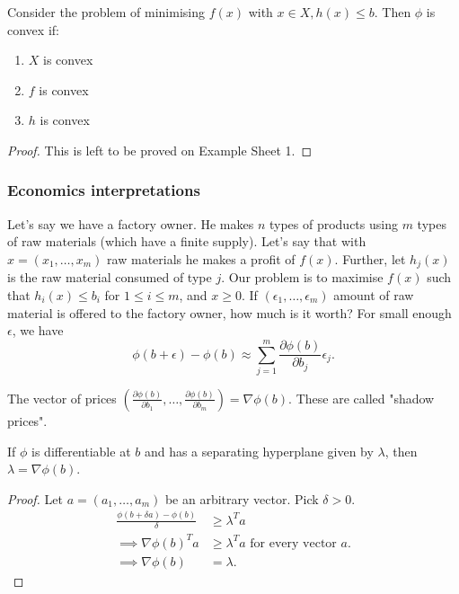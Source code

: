 \documentclass[a4paper]{scrartcl}
\begin{document}
\begin{theorem}
	 Consider the problem of minimising $f (x)$ with $x \in X, h (x)\leq b$. Then $\phi$ is convex if: 
	 \begin{enumerate}
		 \item $X$ is convex
		 \item $f$ is convex
		 \item $h$ is convex
	 \end{enumerate}
\end{theorem}
\begin{proof}
	 This is left to be proved on Example Sheet 1.
\end{proof}
\subsubsection{Economics interpretations}
Let's say we have a factory owner. He makes $n$ types of products using $m$ types of raw materials (which have a finite supply). Let's say that with $x=(x_1,\ldots ,x_m)$ raw materials he makes a profit of $f (x)$.\newline 
Further, let $h_j (x)$ is the raw material consumed of type $j$. Our problem is to maximise $f (x)$ such that $h_i (x) \leq b_i$ for $1 \leq i \leq m$, and $x \geq 0.$\newline 
If $(\epsilon_1,\ldots , \epsilon_m)$ amount of raw material is offered to the factory owner, how much is it worth? For small enough $\epsilon $, we have 
\[\phi (b+\epsilon )-\phi (b)\approx \sum_{j=1}^{m}\frac{\partial \phi (b)}{\partial b_j} \epsilon_j.\]

The vector of prices $(\frac{\partial \phi (b)}{\partial b_1} ,\ldots , \frac{\partial \phi (b)}{\partial b_m} )=\nabla \phi (b)$. These are called "shadow prices".

\begin{theorem}
	 If $\phi$ is differentiable at $b$ and has a separating hyperplane given by $\lambda$, then $\lambda=\nabla \phi (b)$.
\end{theorem}
\begin{proof}
	 Let $a= (a_1,\ldots , a_m)$ be an arbitrary vector. Pick $\delta>0$.
	 \begin{equation*}
		  \begin{split}
			  \frac{\phi (b+\delta a)- \phi (b)}{\delta}&\geq \lambda^T a\\
			  \implies \nabla \phi (b)^T a &\geq \lambda^T a \text{ for every vector } a.\\
			  \implies \nabla \phi (b)&=\lambda.
		  \end{split}
	 \end{equation*} 
\end{proof}
\end{document}
